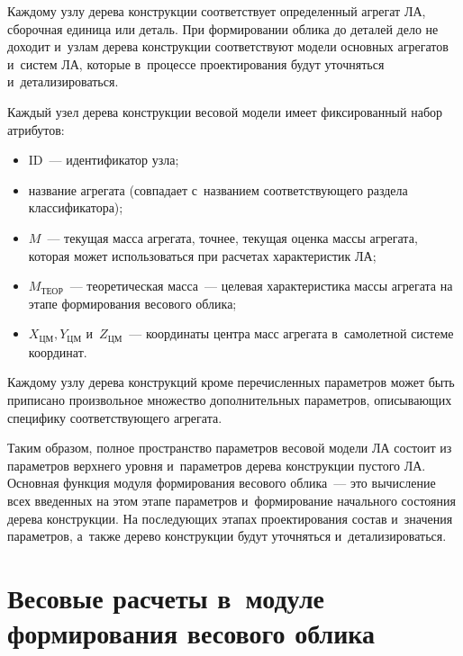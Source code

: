\begin{multicols}{2}
\begin{figure*}
\begin{center}
\end{center}
\vspace*{-6pt}
\end{figure*}

   Каждому узлу дерева конструкции соответствует определенный агрегат ЛА, 
сборочная единица или деталь. При формировании облика до деталей дело не 
доходит и~узлам дерева конструкции соответствуют модели основных агрегатов 
и~сис\-тем ЛА, которые в~процессе проектирования будут уточняться 
и~детализироваться. 
  
  Каждый узел дерева конструкции весовой модели имеет фиксированный 
набор атрибутов:
  \begin{itemize}
\item ID~--- идентификатор узла;
\item название агрегата (совпадает с~названием соответствующего раздела 
классификатора);
\item $M$~--- текущая масса агрегата, точнее, текущая оценка массы агрегата, 
которая может использоваться при расчетах характеристик ЛА; 
\item $M_{\mathrm{ТЕОР}}$~--- теоретическая масса~--- целевая характеристика 
массы агрегата на этапе формирования весового облика; 
\item $X_{\mathrm{ЦМ}}, Y_{\mathrm{ЦМ}}$ и~$Z_{\mathrm{ЦМ}}$~--- координаты 
центра масс агрегата в~самолетной системе координат.
  \end{itemize}
  
  Каждому узлу дерева конструкций кроме пе\-ре\-чис\-ленных параметров может 
быть приписано произвольное множество дополнительных па\-ра\-мет\-ров, 
описывающих специфику со\-от\-вет\-ст\-ву\-юще\-го агрегата. 
  
  Таким образом, полное пространство па\-ра\-мет\-ров весовой модели ЛА со\-сто\-ит 
из па\-ра\-мет\-ров верх\-не\-го уровня и~параметров дерева конструкции пус\-то\-го ЛА. 
Основная функция модуля формирования весового облика~--- это вычисление 
всех введенных на этом этапе па\-ра\-мет\-ров и~формирование начального 
со\-сто\-яния дерева конструкции. На по\-сле\-ду\-ющих этапах проектирования со\-став
 и~значения па\-ра\-мет\-ров, а~так\-же дерево конструкции будут уточняться 
и~детализироваться. 

\vspace*{-3pt}
  
\section{Весовые расчеты в~модуле формирования весового 
облика}


\end{multicols}
